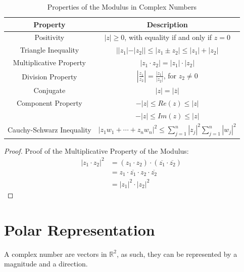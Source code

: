 \begin{table}[H]
    \centering
    \caption{Properties of the Modulus in Complex Numbers}
    \begin{tabular}{|c|c|}
        \hline
        \textbf{Property}         & \textbf{Description}                                                           \\
        \hline
        Positivity                & $|z| \geq 0$, with equality if and only if $z = 0$                             \\
        \hline
        Triangle Inequality       & $||z_1| - |z_2|| \leq |z_1 \pm z_2| \leq |z_1| + |z_2|$                        \\
        \hline
        Multiplicative Property   & $|z_1 \cdot z_2| = |z_1| \cdot |z_2|$                                          \\
        \hline
        Division Property         & $\left|\frac{z_1}{z_2}\right| = \frac{|z_1|}{|z_2|}$, for $z_2 \neq 0$         \\
        \hline
        Conjugate                 & $|z| = |\overline{z}|$                                                         \\
        \hline
        Component Property        & $-|z| \leq Re(z) \leq |z|$                                                     \\ & $-|z| \leq Im(z) \leq |z|$ \\
        \hline
        Cauchy-Schwarz Inequality & $|z_1w_1 + \cdots + z_nw_n|^2 \leq \sum_{j=1}^{n}|z_j|^2\sum_{j=1}^{n}|w_j|^2$ \\
        \hline
    \end{tabular}
\end{table}

\begin{proof}
    Proof of the Multiplicative Property of the Modulus:
    \begin{align*}
        |z_1 \cdot z_2|^2 & = (z_1 \cdot z_2) \cdot (\overline{z_1} \cdot \overline{z_2}) \\
                          & = z_1 \cdot \overline{z_1} \cdot z_2 \cdot \overline{z_2}     \\
                          & = |z_1|^2 \cdot |z_2|^2
    \end{align*}
\end{proof}
\section{Polar Representation}
A complex number are vectors in $\mathbb{R}^2$, as such, they can be represented by a magnitude and a direction. \\

